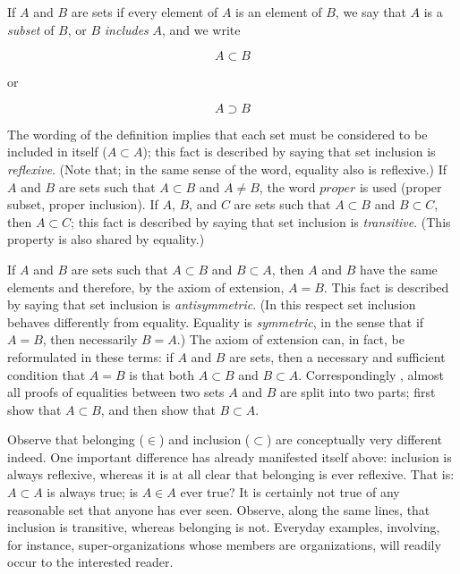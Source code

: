 If $A$ and $B$ are sets if every element of $A$ is an element of $B$, we say that $A$ is a \textit{subset} of $B$, or $B$ \textit{includes} $A$, and we write 

\begin{equation*}
A \subset B
\end{equation*}

or

\begin{equation*}
A \supset B
\end{equation*}

The wording of the definition implies that each set must be considered to be included in itself ($A \subset A$); this fact is described by saying that set inclusion is \textit{reflexive}. (Note that; in the same sense of the word, equality also is reflexive.) If $A$ and $B$ are sets such that $A \subset B$ and $A \neq B$, the word $proper$ is used (proper subset, proper inclusion). If $A$, $B$, and $C$ are sets such that $A \subset B$ and $B \subset C$, then $A \subset C$; this fact is described by saying that set inclusion is \textit{transitive}. (This property is also shared by equality.)

If $A$ and $B$ are sets such that $A \subset B$ and $B \subset A$, then $A$ and $B$ have the same elements and therefore, by the axiom of extension, $A = B$. This fact is described by saying that set inclusion is \textit{antisymmetric}. (In this respect set inclusion behaves differently from equality. Equality is \textit{symmetric}, in the sense that if $A = B$, then necessarily $B = A$.) The axiom of extension can, in fact, be reformulated in these terms: if $A$ and $B$ are sets, then a necessary and sufficient condition that $A = B$ is that both $A \subset B$ and $B \subset A$. Correspondingly , almost all proofs of equalities between two sets $A$ and $B$ are split into two parts; first show that $A \subset B$, and then show that $B \subset A$. 

Observe that belonging ($ \in $) and inclusion ($ \subset$) are conceptually very different indeed. One important difference has already manifested itself above: inclusion is always reflexive, whereas it is at all clear that belonging is ever reflexive. That is: $A \subset A$ is always true; is $A \in A $ ever true? It is certainly not true of any reasonable set that anyone has ever seen. Observe, along the same lines, that inclusion is transitive, whereas belonging is not. Everyday examples, involving, for instance, super-organizations whose members are organizations, will readily occur to the interested reader.